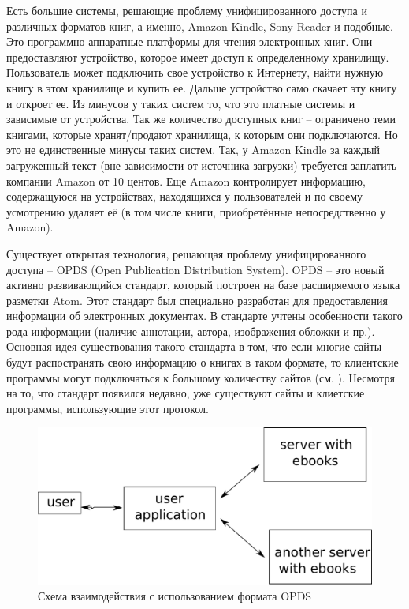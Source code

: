 \documentclass[a4paper]{report}
\begin{document}
Есть большие системы, решающие проблему унифицированного доступа и различных форматов книг, а именно, Amazon Kindle, Sony Reader и подобные. 
Это программно-аппаратные платформы для чтения электронных книг. Они предоставляют устройство, которое имеет доступ к определенному хранилищу. Пользователь может подключить свое устройство к Интернету, найти нужную книгу в этом хранилище и купить ее. Дальше устройство само скачает эту книгу и откроет ее.
Из минусов у таких систем то, что это платные системы и зависимые от устройства. Так же количество доступных книг -- ограничено теми книгами, которые хранят/продают хранилища, к которым они подключаются. Но это не единственные минусы таких систем. Так, у Amazon Kindle за каждый загруженный текст (вне зависимости от источника загрузки) требуется заплатить компании Amazon от 10 центов. Еще Amazon контролирует информацию, содержащуюся на устройствах, находящихся у пользователей и по своему усмотрению удаляет её (в том числе книги, приобретённые непосредственно у Amazon).

Существует открытая технология, решающая проблему унифицированного доступа  -- OPDS (Open Publication Distribution System).
OPDS -- это новый активно развивающийся стандарт, который построен на базе расширяемого языка разметки Atom. Этот стандарт был специально разработан для предоставления информации об электронных документах. В стандарте учтены особенности такого рода информации (наличие аннотации, автора, изображения обложки и пр.).
Основная идея существования такого стандарта в том, что если многие сайты будут распостранять свою информацию о книгах в таком формате, то клиентские программы могут подключаться к большому количеству сайтов (см. ). Несмотря на то, что стандарт появился недавно, уже существуют сайты и клиетские программы, использующие этот протокол. 

\begin{figure}
\centering
\includegraphics[width=.5\textwidth]{scheme}
\caption{Схема взаимодействия с использованием формата OPDS}\label{fig:scheme}
\end{figure}
\end{document}
